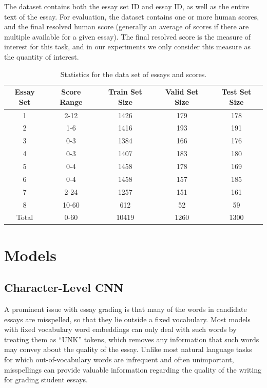 \documentclass[10pt,psamsfonts]{amsart}
\theoremstyle{definition}
\theoremstyle{remark}
\numberwithin{equation}{section}
\begin{document}
The dataset contains both the essay set ID and essay ID, as well as the entire text of the essay. For evaluation, the dataset contains one or more human scores, and the final resolved human score (generally an average of scores if there are multiple available for a given essay). The final resolved score is the measure of interest for this task, and in our experiments we only consider this measure as the quantity of interest.

\begin{table}
	\begin{tabular}{c|c|c|c|c}
		Essay Set & Score Range & Train Set Size & Valid Set Size & Test Set Size\\\hline
		1 & 2-12 & 1426 & 179 & 178\\
		2 & 1-6 & 1416 & 193 & 191\\
		3 & 0-3 & 1384 & 166 & 176\\
		4 & 0-3 & 1407 & 183 & 180 \\
		5 & 0-4 & 1458 & 178 & 169\\
		6 & 0-4 & 1458 & 157 & 185\\
		7 & 2-24 & 1257 & 151 & 161\\ 
		8 & 10-60 & 612 & 52 & 59\\\hline
		Total & 0-60 & 10419 & 1260 & 1300
	\end{tabular}
	\caption{Statistics for the data set of essays and scores.}
	\label{fig:data}
\end{table}

\section*{Models}

\subsection*{Character-Level CNN}

A prominent issue with essay grading is that many of the words in candidate essays are misspelled, so that they lie outside a fixed vocabulary. Most models with fixed vocabulary word embeddings can only deal with such words by treating them as ``UNK'' tokens, which removes any information that such words may convey about the quality of the essay. Unlike most natural language tasks for which out-of-vocabulary words are infrequent and often unimportant, misspellings can provide valuable information regarding the quality of the writing for grading student essays.
\end{document}
